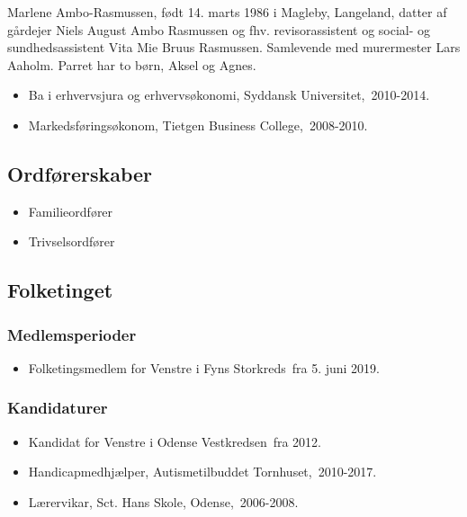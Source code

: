 \documentclass[11pt, a4paper]{awesome-cv}
\begin{document}
\makecvheader[R]
\makelettertitle
\begin{cvletter}
Marlene Ambo-Rasmussen, født 14. marts 1986 i Magleby, Langeland, datter af gårdejer Niels August Ambo Rasmussen og fhv. revisorassistent og social- og sundhedsassistent Vita Mie Bruus Rasmussen. Samlevende med murermester Lars Aaholm. Parret har to børn, Aksel og Agnes. 

\begin{itemize}
\item Ba i erhvervsjura og erhvervsøkonomi, Syddansk Universitet, 2010-2014.
\item Markedsføringsøkonom, Tietgen Business College, 2008-2010.
\end{itemize}
\subsection*{Ordførerskaber}
\begin{itemize}
\item Familieordfører
\item Trivselsordfører
\end{itemize}
\subsection*{Folketinget}
\subsubsection*{Medlemsperioder}
\begin{itemize}
\item Folketingsmedlem for Venstre i Fyns Storkreds fra 5. juni 2019.
\end{itemize}
\subsubsection*{Kandidaturer}
\begin{itemize}
\item Kandidat for Venstre i Odense Vestkredsen fra 2012.
\end{itemize}
\begin{itemize}
\item Handicapmedhjælper, Autismetilbuddet Tornhuset, 2010-2017.
\item Lærervikar, Sct. Hans Skole, Odense, 2006-2008.
\end{itemize}
\end{cvletter}
\end{document}
